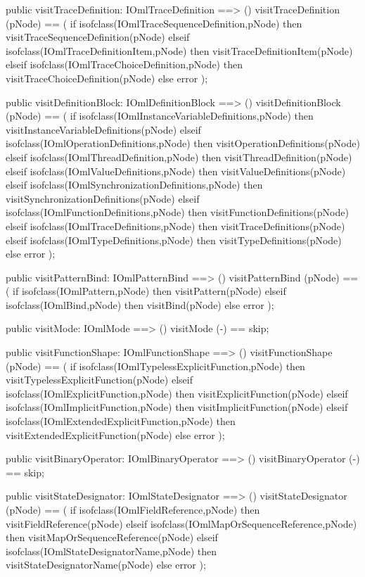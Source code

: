 \begin{vdm_al}
  public visitTraceDefinition: IOmlTraceDefinition ==> ()
  visitTraceDefinition (pNode) ==
    ( if isofclass(IOmlTraceSequenceDefinition,pNode) then visitTraceSequenceDefinition(pNode)
      elseif isofclass(IOmlTraceDefinitionItem,pNode) then visitTraceDefinitionItem(pNode)
      elseif isofclass(IOmlTraceChoiceDefinition,pNode) then visitTraceChoiceDefinition(pNode)
      else error );

  public visitDefinitionBlock: IOmlDefinitionBlock ==> ()
  visitDefinitionBlock (pNode) ==
    ( if isofclass(IOmlInstanceVariableDefinitions,pNode) then visitInstanceVariableDefinitions(pNode)
      elseif isofclass(IOmlOperationDefinitions,pNode) then visitOperationDefinitions(pNode)
      elseif isofclass(IOmlThreadDefinition,pNode) then visitThreadDefinition(pNode)
      elseif isofclass(IOmlValueDefinitions,pNode) then visitValueDefinitions(pNode)
      elseif isofclass(IOmlSynchronizationDefinitions,pNode) then visitSynchronizationDefinitions(pNode)
      elseif isofclass(IOmlFunctionDefinitions,pNode) then visitFunctionDefinitions(pNode)
      elseif isofclass(IOmlTraceDefinitions,pNode) then visitTraceDefinitions(pNode)
      elseif isofclass(IOmlTypeDefinitions,pNode) then visitTypeDefinitions(pNode)
      else error );

  public visitPatternBind: IOmlPatternBind ==> ()
  visitPatternBind (pNode) ==
    ( if isofclass(IOmlPattern,pNode) then visitPattern(pNode)
      elseif isofclass(IOmlBind,pNode) then visitBind(pNode)
      else error );

  public visitMode: IOmlMode ==> ()
  visitMode (-) == skip;

  public visitFunctionShape: IOmlFunctionShape ==> ()
  visitFunctionShape (pNode) ==
    ( if isofclass(IOmlTypelessExplicitFunction,pNode) then visitTypelessExplicitFunction(pNode)
      elseif isofclass(IOmlExplicitFunction,pNode) then visitExplicitFunction(pNode)
      elseif isofclass(IOmlImplicitFunction,pNode) then visitImplicitFunction(pNode)
      elseif isofclass(IOmlExtendedExplicitFunction,pNode) then visitExtendedExplicitFunction(pNode)
      else error );

  public visitBinaryOperator: IOmlBinaryOperator ==> ()
  visitBinaryOperator (-) == skip;

  public visitStateDesignator: IOmlStateDesignator ==> ()
  visitStateDesignator (pNode) ==
    ( if isofclass(IOmlFieldReference,pNode) then visitFieldReference(pNode)
      elseif isofclass(IOmlMapOrSequenceReference,pNode) then visitMapOrSequenceReference(pNode)
      elseif isofclass(IOmlStateDesignatorName,pNode) then visitStateDesignatorName(pNode)
      else error );


\end{vdm_al}
